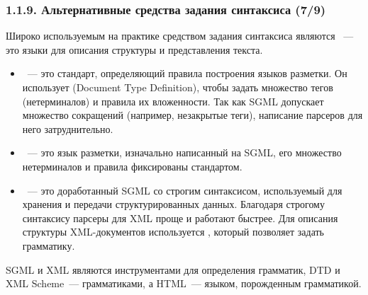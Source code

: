 \begin{frame}
\frametitle{1.1.9. Альтернативные средства задания синтаксиса (7/9)}
Широко используемым на практике средством задания синтаксиса 
являются ~--- это языки для описания структуры и представления текста.
\begin{itemize}

 \item{}~--- это стандарт, определяющий правила построения языков разметки. Он использует  (Document Type Definition), чтобы задать множество тегов (нетерминалов) и правила их вложенности. Так как SGML допускает множество сокращений (например, незакрытые теги), написание парсеров для него затруднительно.
 
 \item{}~--- это язык разметки, изначально написанный на SGML, его множество нетерминалов и правила фиксированы стандартом.
 
 \item{}~--- это доработанный SGML со строгим синтаксисом, используемый для хранения и передачи структурированных данных. Благодаря строгому синтаксису парсеры для XML проще и работают быстрее. Для описания структуры XML-документов используется , который позволяет задать грамматику.

\end{itemize}
 \begin{remark}
 SGML и XML являются инструментами для определения грамматик, DTD и XML Scheme~--- грамматиками, а HTML~--- языком, порожденным грамматикой.
 \end{remark}
\end{frame}




